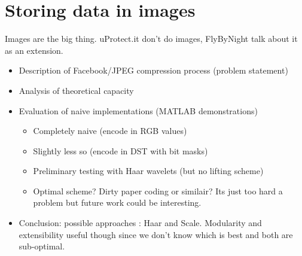 \section{Storing data in images}
    Images are the big thing. uProtect.it don't do images, FlyByNight talk about it as an extension.
    \begin{itemize}
	\item Description of Facebook/JPEG compression process (problem statement)
	\item Analysis of theoretical capacity
	\item Evaluation of naive implementations (MATLAB demonstrations)
            \begin{itemize}
		\item Completely naive (encode in RGB values)
		\item Slightly less so (encode in DST with bit masks)
                \item Preliminary testing with Haar wavelets (but no lifting scheme)
                \item Optimal scheme? Dirty paper coding or similair? Its just too hard a problem but future work could be interesting.
             \end{itemize}
	\item Conclusion: possible approaches : Haar and Scale. Modularity and extensibility useful though since we don't know which is best and both are sub-optimal.
    \end{itemize}
    
